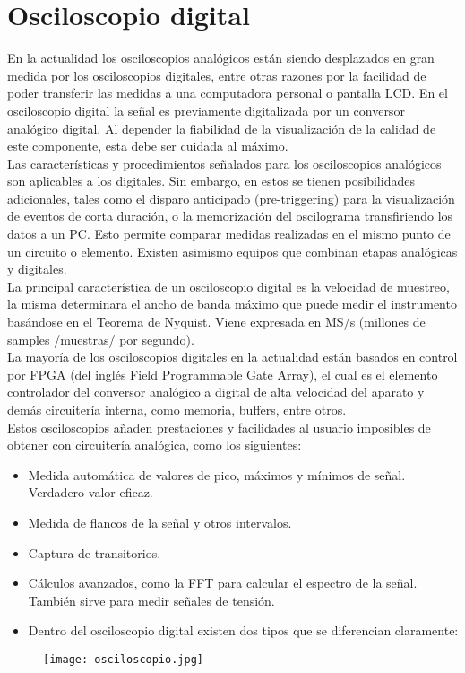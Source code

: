 \documentclass[a4paper,12pt]{report}
\begin{document}
\section{Osciloscopio digital}
En la actualidad los osciloscopios analógicos están siendo desplazados en gran medida por los osciloscopios digitales, entre otras razones por la facilidad de poder transferir las medidas a una computadora personal o pantalla LCD. En el osciloscopio digital la señal es previamente digitalizada por un conversor analógico digital. Al depender la fiabilidad de la visualización de la calidad de este componente, esta debe ser cuidada al máximo.\\
Las características y procedimientos señalados para los osciloscopios analógicos son aplicables a los digitales. Sin embargo, en estos se tienen posibilidades adicionales, tales como el disparo anticipado (pre-triggering) para la visualización de eventos de corta duración, o la memorización del oscilograma transfiriendo los datos a un PC. Esto permite comparar medidas realizadas en el mismo punto de un circuito o elemento. Existen asimismo equipos que combinan etapas analógicas y digitales.\\
La principal característica de un osciloscopio digital es la velocidad de muestreo, la misma determinara el ancho de banda máximo que puede medir el instrumento basándose en el Teorema de Nyquist. Viene expresada en MS/s (millones de samples /muestras/ por segundo).\\
La mayoría de los osciloscopios digitales en la actualidad están basados en control por FPGA (del inglés Field Programmable Gate Array), el cual es el elemento controlador del conversor analógico a digital de alta velocidad del aparato y demás circuitería interna, como memoria, buffers, entre otros.\\
Estos osciloscopios añaden prestaciones y facilidades al usuario imposibles de obtener con circuitería analógica, como los siguientes:
\begin{itemize}
\item Medida automática de valores de pico, máximos y mínimos de señal. Verdadero valor eficaz.
\item Medida de flancos de la señal y otros intervalos.
\item Captura de transitorios.
\item Cálculos avanzados, como la FFT para calcular el espectro de la señal. También sirve para medir señales de tensión.
\item Dentro del osciloscopio digital existen dos tipos que se diferencian claramente:
\end{itemize}
\begin{figure}[H]
\centering
\texttt{[image: osciloscopio.jpg]}
\end{figure}
\end{document}
